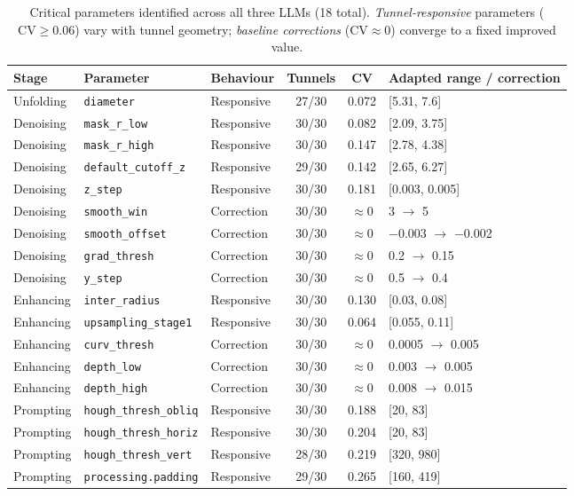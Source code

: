 \documentclass[a4paper,fleqn]{cas-dc}
\begin{document}
\begin{table}[t]
\caption{Critical parameters identified across all three LLMs (18 total). \emph{Tunnel-responsive} parameters ($\text{CV} \geq 0.06$) vary with tunnel geometry; \emph{baseline corrections} ($\text{CV} \approx 0$) converge to a fixed improved value.}\label{tab:critical-params}
\begin{tabular*}{\textwidth}{@{\extracolsep{\fill}} l l l c c l @{}}
\toprule
Stage & Parameter & Behaviour & Tunnels & CV & Adapted range / correction \\
\midrule
Unfolding & \texttt{diameter} & Responsive & 27/30 & 0.072 & [5.31, 7.6] \\
\midrule
Denoising & \texttt{mask\_r\_low} & Responsive & 30/30 & 0.082 & [2.09, 3.75] \\
Denoising & \texttt{mask\_r\_high} & Responsive & 30/30 & 0.147 & [2.78, 4.38] \\
Denoising & \texttt{default\_cutoff\_z} & Responsive & 29/30 & 0.142 & [2.65, 6.27] \\
Denoising & \texttt{z\_step} & Responsive & 30/30 & 0.181 & [0.003, 0.005] \\
Denoising & \texttt{smooth\_win} & Correction & 30/30 & $\approx$0 & 3 $\rightarrow$ 5 \\
Denoising & \texttt{smooth\_offset} & Correction & 30/30 & $\approx$0 & $-$0.003 $\rightarrow$ $-$0.002 \\
Denoising & \texttt{grad\_thresh} & Correction & 30/30 & $\approx$0 & 0.2 $\rightarrow$ 0.15 \\
Denoising & \texttt{y\_step} & Correction & 30/30 & $\approx$0 & 0.5 $\rightarrow$ 0.4 \\
\midrule
Enhancing & \texttt{inter\_radius} & Responsive & 30/30 & 0.130 & [0.03, 0.08] \\
Enhancing & \texttt{upsampling\_stage1} & Responsive & 30/30 & 0.064 & [0.055, 0.11] \\
Enhancing & \texttt{curv\_thresh} & Correction & 30/30 & $\approx$0 & 0.0005 $\rightarrow$ 0.005 \\
Enhancing & \texttt{depth\_low} & Correction & 30/30 & $\approx$0 & 0.003 $\rightarrow$ 0.005 \\
Enhancing & \texttt{depth\_high} & Correction & 30/30 & $\approx$0 & 0.008 $\rightarrow$ 0.015 \\
\midrule
Prompting & \texttt{hough\_thresh\_obliq} & Responsive & 30/30 & 0.188 & [20, 83] \\
Prompting & \texttt{hough\_thresh\_horiz} & Responsive & 30/30 & 0.204 & [20, 83] \\
Prompting & \texttt{hough\_thresh\_vert} & Responsive & 28/30 & 0.219 & [320, 980] \\
Prompting & \texttt{processing.padding} & Responsive & 29/30 & 0.265 & [160, 419] \\
\bottomrule
\end{tabular*}
\end{table}
\end{document}
